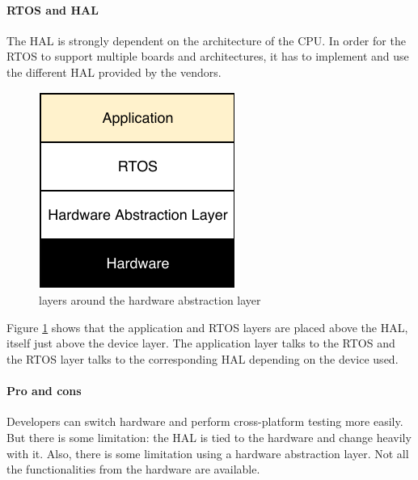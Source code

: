\paragraph{RTOS and HAL}
The HAL is strongly dependent on the architecture of the CPU.
In order for the RTOS to support multiple boards and architectures, it has to implement and use the different HAL provided by the vendors.

\begin{figure}[!h]
  \centering
  \includegraphics[scale=1]{assets/hal-layers.pdf}
  \caption{\label{fig:hal-layer}layers around the hardware abstraction layer}
\end{figure}

Figure \ref{fig:hal-layer} shows that the application and RTOS layers are placed above the HAL, itself just above the device layer.
The application layer talks to the RTOS and the RTOS layer talks to the corresponding HAL depending on the device used.

\paragraph{Pro and cons}
Developers can switch hardware and perform cross-platform testing more easily.
But there is some limitation: the HAL is tied to the hardware and change heavily with it.
Also, there is some limitation using a hardware abstraction layer.
Not all the functionalities from the hardware are available.